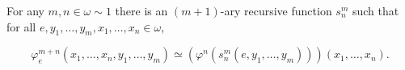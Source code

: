 For any $m, n \in \omega \sim 1$ there is an $(m + 1)$-ary recursive function $s_n^m$ such that for all $e, y_1, \ldots, y_m, x_1, \ldots, x_n \in \omega$,

$$\varphi_e^{m+n}(x_1, \ldots, x_n, y_1, \ldots, y_m) \simeq (\varphi^n(s_n^m(e, y_1, \ldots, y_m)))(x_1, \ldots, x_n).$$

